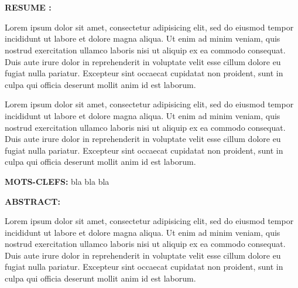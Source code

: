 


\pagestyle{empty}

\AddToShipoutPicture*{\BackgroundPicLastPage}

\vspace{1.5cm}


\begin{center}{\LARGE \textbf{\myTitle}}\\
\vspace{.4cm}
{\large \textbf{\myName}}\\
\end{center}

\vspace{.9cm}

\textbf{RESUME :}

Lorem ipsum dolor sit amet, consectetur adipisicing elit, sed do eiusmod
tempor incididunt ut labore et dolore magna aliqua. Ut enim ad minim veniam,
quis nostrud exercitation ullamco laboris nisi ut aliquip ex ea commodo
consequat. Duis aute irure dolor in reprehenderit in voluptate velit esse
cillum dolore eu fugiat nulla pariatur. Excepteur sint occaecat cupidatat non
proident, sunt in culpa qui officia deserunt mollit anim id est laborum.

Lorem ipsum dolor sit amet, consectetur adipisicing elit, sed do eiusmod
tempor incididunt ut labore et dolore magna aliqua. Ut enim ad minim veniam,
quis nostrud exercitation ullamco laboris nisi ut aliquip ex ea commodo
consequat. Duis aute irure dolor in reprehenderit in voluptate velit esse
cillum dolore eu fugiat nulla pariatur. Excepteur sint occaecat cupidatat non
proident, sunt in culpa qui officia deserunt mollit anim id est laborum.

\vspace{.6cm}

\textbf{MOTS-CLEFS:}  bla bla bla 

\vspace{1.0cm}

\textbf{ABSTRACT:} 

Lorem ipsum dolor sit amet, consectetur adipisicing elit, sed do eiusmod
tempor incididunt ut labore et dolore magna aliqua. Ut enim ad minim veniam,
quis nostrud exercitation ullamco laboris nisi ut aliquip ex ea commodo
consequat. Duis aute irure dolor in reprehenderit in voluptate velit esse
cillum dolore eu fugiat nulla pariatur. Excepteur sint occaecat cupidatat non
proident, sunt in culpa qui officia deserunt mollit anim id est laborum.

